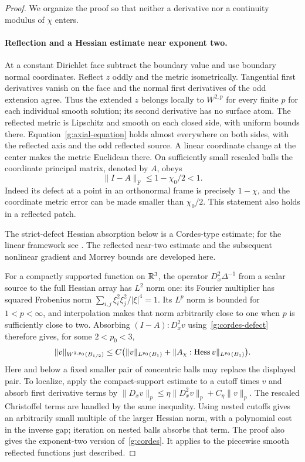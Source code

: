 \begin{proof}
We organize the proof so that neither a derivative nor a continuity
modulus of $\chi$ enters.

\paragraph{Reflection and a Hessian estimate near exponent two.}
At a constant Dirichlet face subtract the boundary value and use boundary
normal coordinates.  Reflect $z$ oddly and the metric isometrically.
Tangential first derivatives vanish on the face and the normal first
derivatives of the odd extension agree.  Thus the extended $z$ belongs
locally to $W^{2,p}$ for every finite $p$ for each individual smooth
solution; its second derivative has no surface atom.  The reflected metric
is Lipschitz and smooth on each closed side, with uniform bounds there.
Equation~\eqref{g:axial-equation} holds almost everywhere on both sides,
with the reflected axis and the odd reflected source.  A linear coordinate
change at the center makes the metric Euclidean there.  On sufficiently
small rescaled balls the coordinate principal matrix, denoted by $A$, obeys
\begin{equation}\label{g:cordes-defect}
 \|I-A\|_{\mathrm F}\leq1-\chi_0/2<1.
\end{equation}
Indeed its defect at a point in an orthonormal frame is precisely
$1-\chi$, and the coordinate metric error can be made smaller than
$\chi_0/2$.  This statement also holds in a reflected patch.

The strict-defect Hessian absorption below is a Cordes-type estimate;
for the linear framework see \cite[Section~2, Lemma~1, and Section~2.1,
Theorems~2--3]{SmearsSuli2013}.  The reflected near-two estimate and the
subsequent nonlinear gradient and Morrey bounds are developed here.

For a compactly supported function on $\mathbb R^3$, the operator
$D_x^2\Delta^{-1}$ from a scalar source to the full Hessian array has
$L^2$ norm one: its Fourier multiplier has squared Frobenius norm
$\sum_{i,j}\xi_i^2\xi_j^2/|\xi|^4=1$.  Its $L^p$ norm is bounded for
$1<p<\infty$, and interpolation makes that norm arbitrarily close to one
when $p$ is sufficiently close to two.  Absorbing
$(I-A):D_x^2v$ using~\eqref{g:cordes-defect} therefore gives, for some
$2<p_0<3$,
\begin{equation}\label{g:cordes}
 \|v\|_{W^{2,p_0}(B_{1/2})}
 \leq C\bigl(\|v\|_{L^{p_0}(B_1)}
        +\|A_\chi:\operatorname{Hess} v\|_{L^{p_0}(B_1)}\bigr).
\end{equation}
Here and below a fixed smaller pair of concentric balls may replace the
displayed pair.  To localize, apply the compact-support estimate to a
cutoff times $v$ and absorb first derivative terms by
$\|D_xv\|_p\leq\eta\|D_x^2v\|_p+C_\eta\|v\|_p$.
The rescaled Christoffel terms are handled by the same inequality.
Using nested cutoffs gives an arbitrarily small multiple of the larger
Hessian norm, with a polynomial cost in the inverse gap; iteration on
nested balls absorbs that term.  The proof also gives the exponent-two
version of~\eqref{g:cordes}.  It applies to the piecewise smooth reflected
functions just described.


\end{proof}
